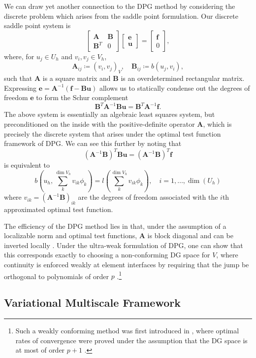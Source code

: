 \documentclass[final,leqno]{siamltex}
\newcommand{\bs}[1]{\boldsymbol{#1}}
\newcommand{\LRp}[1]{\left( #1 \right)}
\begin{document}
We can draw yet another connection to the DPG method by considering the discrete problem which arises from the saddle point formulation.  Our discrete saddle point system is
\[
\left[\begin{array}{cc} \bs{A} &\bs{B}\\ \bs{B}^T&{0}\end{array}\right]\left[\begin{array}{c}\bs{e}\\ \bs{u}\end{array}\right] = \left[\begin{array}{c}\bs{f}\\ 0\end{array}\right],
\]
where, for $u_j\in U_h$ and $v_i,v_j\in V_h$, 
\[
\bs{A}_{ij} \coloneqq \LRp{v_i,v_j}_V, \quad \bs{B}_{ij} \coloneqq b\LRp{u_j,v_i},
\]
such that $\bs{A}$ is a square matrix and $\bs{B}$ is an overdetermined rectangular matrix.  Expressing $\bs{e} = \bs{A}^{-1}\LRp{\bs{f}-\bs{B}\bs{u}}$ allows us to statically condense out the degrees of freedom $\bs{e}$ to form the Schur complement
\[
\bs{B}^T \bs{A}^{-1}\bs{B} \bs{u} = \bs{B}^T \bs{A}^{-1}\bs{f}.
\]
The above system is essentially an algebraic least squares system, but preconditioned on the inside with the positive-definite operator $\bs{A}$, which is precisely the discrete system that arises under the optimal test function framework of DPG.  We can see this further by noting that 
\[
\LRp{\bs{A}^{-1}\bs{B}}^T\bs{B} \bs{u} = \LRp{\bs{A}^{-1}\bs{B}}^T\bs{f} 
\]
is equivalent to 
\[
b\LRp{u_h, \sum_k^{\dim{V_h}} v_{ik}\phi_k} = l\LRp{\sum_k^{\dim{V_h}} v_{ik}\phi_k}, \quad i = 1,\ldots,\dim(U_h)
\]
where $v_{ik} = \LRp{\bs{A}^{-1}\bs{B}}_{ik}$ are the degrees of freedom associated with the $i$th approximated optimal test function.

The efficiency of the DPG method lies in that, under the assumption of a localizable norm and optimal test functions, $\bs{A}$ is block diagonal and can be inverted locally \cite{overviewDPG}.  Under the ultra-weak formulation of DPG, one can show that this corresponds exactly to choosing a non-conforming DG space for $V$, where continuity is enforced weakly at element interfaces by requiring that the jump be orthogonal to polynomials of order $p$ \cite{globalLocalDPG}.\footnote{Such a weakly conforming method was first introduced in \cite{brenner2008mathematical}, where optimal rates of convergence were proved under the assumption that the DG space is at most of order $p+1$ .}  

\subsection{Variational Multiscale Framework}
\end{document}
